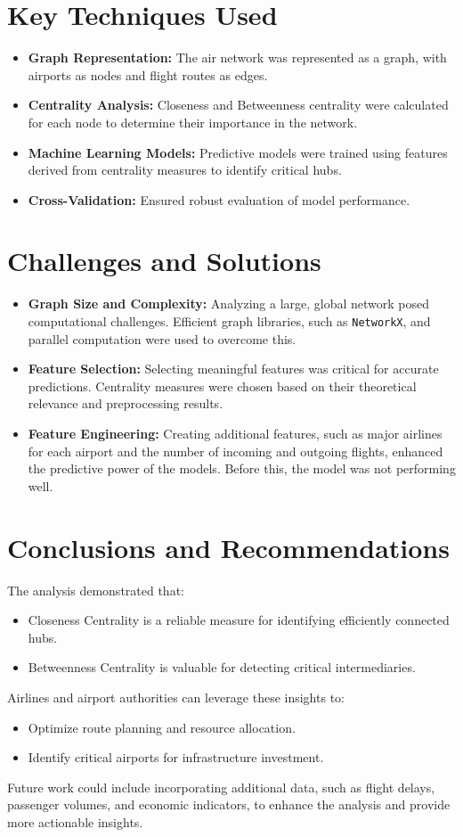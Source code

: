 \documentclass[12pt]{article}
\begin{document}
\newpage

\section*{Key Techniques Used}
\begin{itemize}
	\item \textbf{Graph Representation:} The air network was represented as a graph, with airports as nodes and flight routes as edges.
	\item \textbf{Centrality Analysis:} Closeness and Betweenness centrality were calculated for each node to determine their importance in the network.
	\item \textbf{Machine Learning Models:} Predictive models were trained using features derived from centrality measures to identify critical hubs.
	\item \textbf{Cross-Validation:} Ensured robust evaluation of model performance.
\end{itemize}

\section*{Challenges and Solutions}
\begin{itemize}
	\item \textbf{Graph Size and Complexity:} Analyzing a large, global network posed computational challenges. Efficient graph libraries, such as \texttt{NetworkX}, and parallel computation were used to overcome this.
	\item \textbf{Feature Selection:} Selecting meaningful features was critical for accurate predictions. Centrality measures were chosen based on their theoretical relevance and preprocessing results.
	\item \textbf{Feature Engineering:} Creating additional features, such as major airlines for each airport and the number of incoming and outgoing flights, enhanced the predictive power of the models. Before this, the model was not performing well.
\end{itemize}

\section*{Conclusions and Recommendations}
The analysis demonstrated that:
\begin{itemize}
	\item Closeness Centrality is a reliable measure for identifying efficiently connected hubs.
	\item Betweenness Centrality is valuable for detecting critical intermediaries.
\end{itemize}
Airlines and airport authorities can leverage these insights to:
\begin{itemize}
	\item Optimize route planning and resource allocation.
	\item Identify critical airports for infrastructure investment.
\end{itemize}

Future work could include incorporating additional data, such as flight delays, passenger volumes, and economic indicators, to enhance the analysis and provide more actionable insights.
\end{document}
